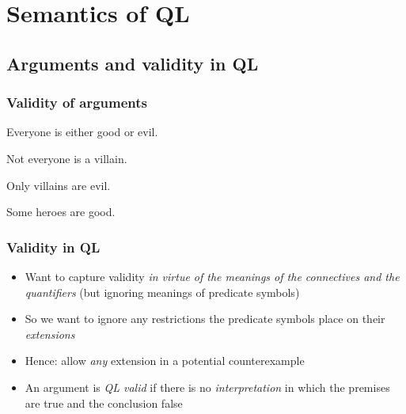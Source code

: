 ﻿%

\setcounter{section}{5}

\section{Semantics of QL}

\subsection{Arguments and validity in QL}

\begin{frame}
  \frametitle{Validity of arguments}

  \begin{earg}
    \item[] Everyone is either good or evil.
    \item[] Not everyone is a villain.
    \item[] Only villains are evil.
    \item[\therefore] Some heroes are good.
  \end{earg}

\end{frame}

\begin{frame}
\frametitle{Validity in QL}

\begin{itemize}[<+->]
\item Want to capture validity \emph{in virtue of the meanings of the
  connectives and the quantifiers} (but ignoring meanings of predicate
  symbols)
\item So we want to ignore any restrictions the predicate symbols place on their \emph{extensions}
\item Hence: allow \emph{any} extension in a potential counterexample
\item An argument is \emph{QL valid} if there is no \emph{interpretation} in which the premises are true and the conclusion false
\end{itemize}
\end{frame}



